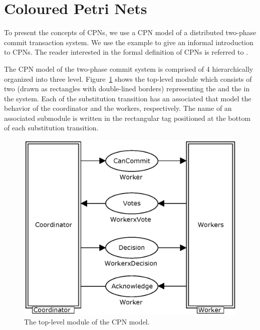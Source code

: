 \section{Coloured Petri Nets}

To present the concepts of CPNs, we use a CPN model of a distributed
two-phase commit transaction system. We use the example to give an
informal introduction to CPNs. The reader interested in the formal
definition of CPNs is referred to \cite{X}.


The CPN model of the two-phase commit system is comprised of 4
 hierarchically organized into three
level. Figure~\ref{fig:commit} shows the top-level module which
consists of two  (drawn as
rectangles with double-lined borders) representing the
 and the  in the system. Each of
the substitution transition has an associated  that
model the behavior of the coordinator and the workers,
respectively. The name of an associated submodule is written in the
rectangular tag positioned at the bottom of each substitution
transition.

\begin{figure}[b]
\centering
\includegraphics[scale=.52]{figures/Commit.eps}
\caption{The top-level module of the CPN model.}
\label{fig:commit}
\end{figure}


